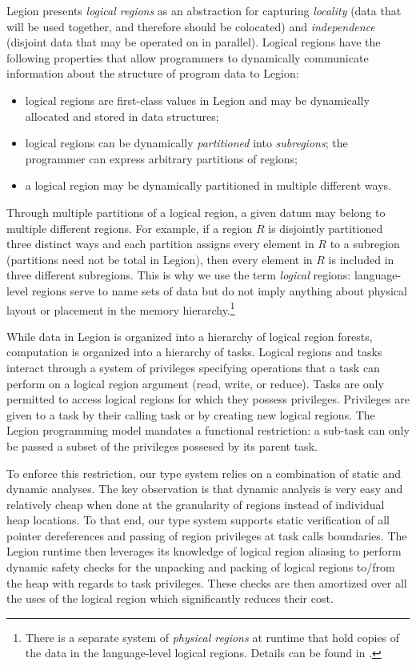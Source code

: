 Legion presents {\em logical regions} as an
abstraction for capturing {\em locality} (data that will be used together,
and therefore should be colocated) and {\em independence} (disjoint data
that may be operated on in parallel).  Logical regions have the following
properties that allow programmers to dynamically communicate information
about the structure of program data to Legion:
\begin{itemize}
\item  logical regions are first-class values in Legion
and may be dynamically allocated and stored in data structures;

\item logical regions can be dynamically {\em partitioned} into {\em subregions}; 
the programmer can express arbitrary partitions of regions;

\item  a logical region may be dynamically partitioned in multiple different ways.
\end{itemize}
Through multiple partitions
of a logical region, a given datum may belong to multiple different regions.  
For example, if a region $R$ is disjointly partitioned three distinct ways 
and each partition assigns every element in $R$ to a
subregion (partitions need not be total in Legion), then every element
in $R$ is included in three different subregions.  This is why we use
the term {\em logical} regions: language-level regions serve to name
sets of data but do not imply anything about physical layout or placement
in the memory hierarchy.\footnote{There
is a separate system of {\em physical regions} at runtime that hold
copies of the data in the language-level logical regions.  Details can
be found in \cite{Legion12}.}

While data in Legion is organized into a hierarchy of logical region forests, 
computation is organized into a hierarchy of tasks.  Logical regions and tasks interact
through a system of privileges specifying operations that a task
can perform on a logical region argument (read, write, or reduce).  
Tasks are only permitted to access logical regions for which they 
possess privileges.  Privileges are given to a task by their calling task
or by creating new logical regions.  The Legion programming model 
mandates a functional restriction: a sub-task can only be passed a subset
of the privileges possesed by its parent task.  

To enforce this restriction, our type system relies on a combination of static 
and dynamic analyses.  The key observation is that dynamic
analysis is very easy and relatively cheap when done at the granularity of
regions instead of individual heap locations.  To that end, our type system supports
static verification of all pointer dereferences and passing of region privileges at 
task calls boundaries.  The Legion runtime then leverages its knowledge of logical
region aliasing to perform dynamic safety checks for the unpacking
and packing of logical regions to/from the heap with regards to task privileges.  
These checks are then amortized over all the uses of the logical region 
which significantly reduces their cost.

